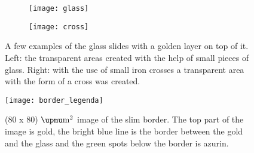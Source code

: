 \documentclass[twoside,single]{lion-msc}
\begin{document}
\begin{figure}
\begin{subfigure}{.5\textwidth}
  \centering
  \texttt{[image: glass]}
  \label{cross}
\end{subfigure}%
\begin{subfigure}{.5\textwidth}
  \centering
  \texttt{[image: cross]}
  \label{glass}
\end{subfigure}
\caption{A few examples of the \diameter 25mm glass slides with a golden layer on top of it. Left: the transparent areas created with the help of small pieces of glass. Right: with the use of small iron crosses a transparent area with the form of a cross was created.}
\label{gold_layer}
\end{figure}

\begin{figure}[ht!]
\centering
\texttt{[image: border\_legenda]}
\caption{(80 x 80) $\upmu \textup{m}^{2}$ image of the slim border. The top part of the image is gold, the bright blue line is the border between the gold and the glass and the green spots below the border is azurin.}
\label{border}
\end{figure}
\end{document}
